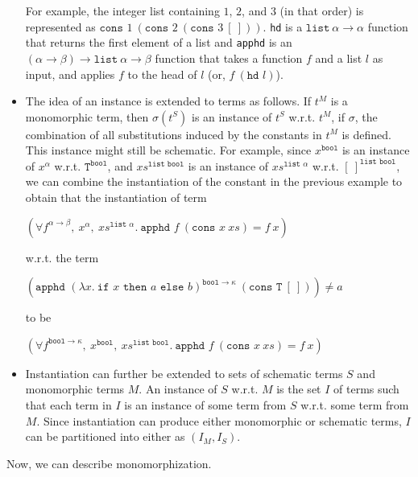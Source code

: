 \documentclass{article}
\begin{document}
\begin{itemize}
			For example, the integer list 
			containing $1$, $2$, and $3$ (in that 
			order) is represented as 
			$\texttt{cons }1\ (\texttt{cons }2
			\ (\texttt{cons }3\ [\ ]))$.
			\texttt{hd} is a $\texttt{list}\ 
			\alpha \to \alpha$ function that 
			returns the first element of a list 
			and \texttt{apphd} is an $(\alpha
			\to \beta) \to \texttt{list}\
			\alpha \to \beta$ function that
			takes a function $f$ and a list 
			$l$ as input, and applies $f$
			to the head of $l$ (or, $f\ 
			(\texttt{hd }l)$).
		\item The idea of an instance is 
			extended to terms as follows. If 
			$t^M$ is a monomorphic term, then 
			$\sigma(t^S)$ is an instance of 
			$t^S$ w.r.t. $t^M$, if 
			$\sigma$, the combination of all 
			substitutions induced by the 
			constants in $t^M$ is defined. This 
			instance might still be schematic. For 
			example, since $x^{\texttt{bool}}$ is 
			an instance of $x^{\alpha}$ w.r.t.
			$\texttt{T}^{\texttt{bool}}$, 
			and $xs^{\texttt{list bool}}$ is 
			an instance of 
			$xs^{\texttt{list }\alpha}$ 
			w.r.t. $[\ ]^{\texttt{list bool}}$,
			we can combine the instantiation 
			of the constant in the previous 
			example to obtain that the 
			instantiation of term
			\begin{center}
				$(\forall f^{\alpha \to \beta},\ 
				x^{\alpha},\ xs^{\texttt{list }
				\alpha}.\ \texttt{apphd }f\ 
				(\texttt{cons }x\ xs) = f\ x)$
			\end{center}
			w.r.t. the term
			\begin{center}
				$(\texttt{apphd }(\lambda 
				x.\ \texttt{if }x\texttt{ then }
				a \texttt{ else } b)^{\texttt{bool} 
				\to \kappa}\ (\texttt{cons T}\ 
				[\ ])) \neq a$
			\end{center}
			to be
			\begin{center}
				$(\forall f^{\texttt{bool}
				\to \kappa},\ x^{\texttt{bool}},
				\ xs^{\texttt{list bool}}.\ 
				\texttt{apphd }f\ (\texttt{cons }x
				\ xs) = f\ x)$
			\end{center}
		\item Instantiation can further be 
			extended to sets of schematic 
			terms $S$ and monomorphic terms $M$. 
			An instance of $S$ w.r.t. 
			$M$ is the set $I$ of terms such 
			that each term in $I$ is an instance 
			of some term from $S$ w.r.t. 
			some term from $M$. Since 
			instantiation can produce either 
			monomorphic or schematic terms, $I$
			can be partitioned into either as
			$(I_M, I_S)$.
		\end{itemize}
		Now, we can describe monomorphization.
\end{document}
